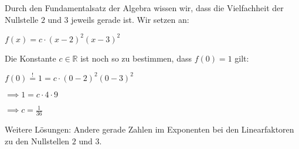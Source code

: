 \item Durch den Fundamentalsatz der Algebra wissen wir, dass die Vielfachheit der Nullstelle $2$ und $3$ jeweils gerade ist. Wir setzen an:

$f(x)=c \cdot (x-2)^2(x-3)^2$

Die Konstante $c \in \mathbb{R}$ ist noch so zu bestimmen, dass $f(0) = 1$ gilt:

$f(0) \stackrel{!}{=} 1 =c \cdot (0-2)^2(0-3)^2$

$\implies 1 = c \cdot 4 \cdot 9$

$\implies c=\frac{1}{36}$

Weitere Lösungen: Andere gerade Zahlen im Exponenten bei den Linearfaktoren zu den Nullstellen $2$ und $3$.

